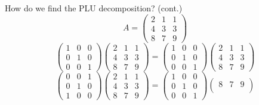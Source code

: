 \documentclass{beamer}
\begin{document}
\begin{frame}{How do we find the PLU decomposition? (cont.)}
\[A=
\begin{pmatrix}{}
                2 & 1 & 1 \\
                4 & 3 & 3 \\
                8 & 7 & 9
            \end{pmatrix}
            \]
            \[
  \begin{pmatrix}{}
                1 & 0 & 0 \\
                0 & 1 & 0 \\
                0 & 0 & 1
            \end{pmatrix}\begin{pmatrix}{}
                2 & 1 & 1 \\
                4 & 3 & 3 \\
                8 & 7 & 9
            \end{pmatrix}
            =\begin{pmatrix}{}
                1 & 0 & 0 \\
                0 & 1 & 0 \\
                0 & 0 & 1
            \end{pmatrix}
            \begin{pmatrix}{}
                2 & 1 & 1 \\
                4 & 3 & 3 \\
                8 & 7 & 9
            \end{pmatrix}
            \]
            \[
  \begin{pmatrix}{}
                0 & 0 & 1 \\
                0 & 1 & 0 \\
                1 & 0 & 0
            \end{pmatrix}\begin{pmatrix}{}
                2 & 1 & 1 \\
                4 & 3 & 3 \\
                8 & 7 & 9
            \end{pmatrix}
            =\begin{pmatrix}{}
                1 & 0 & 0 \\
                0 & 1 & 0 \\
                0 & 0 & 1
            \end{pmatrix}
            \begin{pmatrix}{}
                8 & 7 & 9 \\

\end{pmatrix}\]
\end{frame}
\end{document}
